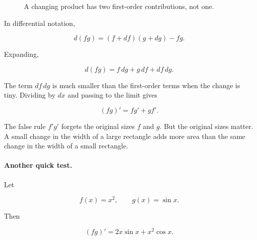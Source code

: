 \begin{figure}[h]
\centering
{}
\caption{A changing product has two first-order contributions, not one.}
\label{fig:product-rule-warning-strips}
\end{figure}

In differential notation,

\[
d(fg)
=
(f+df)(g+dg)-fg.
\]

Expanding,

\[
d(fg)=f\,dg+g\,df+df\,dg.
\]

The term \(df\,dg\) is much smaller than the first-order terms when the change is tiny.  Dividing by \(dx\) and passing to the limit gives

\[
(fg)'=fg'+gf'.
\]

The false rule \(f'g'\) forgets the original sizes \(f\) and \(g\).  But the original sizes matter.  A small change in the width of a large rectangle adds more area than the same change in the width of a small rectangle.

\paragraph{Another quick test.}
Let

\[
f(x)=x^2,
\qquad
g(x)=\sin x.
\]

Then

\[
(fg)'=2x\sin x+x^2\cos x.
\]

